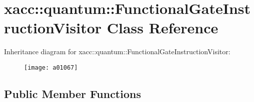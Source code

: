 \hypertarget{a01067}{}\section{xacc\+:\+:quantum\+:\+:Functional\+Gate\+Instruction\+Visitor Class Reference}
\label{a01067}
Inheritance diagram for xacc\+:\+:quantum\+:\+:Functional\+Gate\+Instruction\+Visitor\+:\begin{figure}[H]
\begin{center}
\leavevmode
\texttt{[image: a01067]}
\end{center}
\end{figure}
\subsection*{Public Member Functions}
